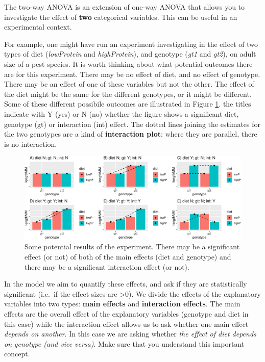 \documentclass[
  a4paperpaper,
]{book}
\begin{document}
The two-way ANOVA is an extension of one-way ANOVA that allows you to investigate the effect of \textbf{two} categorical variables. This can be useful in an experimental context.

For example, one might have run an experiment investigating in the effect of two types of diet (\emph{lowProtein} and \emph{highProtein}), and genotype (\emph{gt1} and \emph{gt2}), on adult size of a pest species. It is worth thinking about what potential outcomes there are for this experiment. There may be no effect of diet, and no effect of genotype. There may be an effect of one of these variables but not the other. The effect of the diet might be the same for the different genotypes, or it might be different. Some of these different possibile outcomes are illustrated in Figure \ref{fig:possibilities}. the titles indicate with Y (yes) or N (no) whether the figure shows a significant diet, genotype (gt) or interaction (int) effect. The dotted lines joining the estimates for the two genotypes are a kind of \textbf{interaction plot}: where they are parallel, there is no interaction.

\begin{figure}[ht]

{\centering \includegraphics{BB852_files/figure-latex/possibilities-1} 

}

\caption{Some potential results of the experiment. There may be a significant effect (or not) of both of the main effects (diet and genotype) and there may be a significant interaction effect (or not).}\label{fig:possibilities}
\end{figure}

In the model we aim to quantify these effects, and ask if they are statistically significant (i.e.~if the effect sizes are \textgreater0). We divide the effects of the explanatory variables into two types: \textbf{main effects} and \textbf{interaction effects}. The main effects are the overall effect of the explanatory variables (genotype and diet in this case) while the interaction effect allows us to ask whether one main effect \emph{depends on another}. In this case we are asking whether \emph{the effect of diet depends on genotype (and vice versa)}. Make sure that you understand this important concept.
\end{document}
